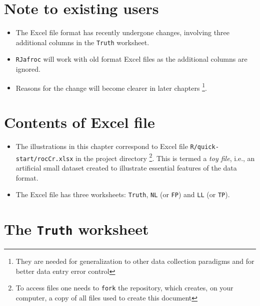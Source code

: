 \documentclass[
]{book}
\providecommand{\tightlist}{%
  \setlength{\itemsep}{0pt}\setlength{\parskip}{0pt}}
\begin{document}
\hypertarget{quick-start-data-format-note-to-existing-users}{%
\section{Note to existing users}\label{quick-start-data-format-note-to-existing-users}}

\begin{itemize}
\tightlist
\item
  The Excel file format has recently undergone changes, involving three additional columns in the \texttt{Truth} worksheet.
\item
  \texttt{RJafroc} will work with old format Excel files as the additional columns are ignored.
\item
  Reasons for the change will become clearer in later chapters \footnote{They are needed for generalization to other data collection paradigms and for better data entry error control}.
\end{itemize}

\hypertarget{quick-start-data-format-contents}{%
\section{Contents of Excel file}\label{quick-start-data-format-contents}}

\begin{itemize}
\tightlist
\item
  The illustrations in this chapter correspond to Excel file \texttt{R/quick-start/rocCr.xlsx} in the project directory \footnote{To access files one needs to \texttt{fork} the repository, which creates, on your computer, a copy of all files used to create this document}. This is termed a \emph{toy file}, i.e., an artificial small dataset created to illustrate essential features of the data format.
\item
  The Excel file has three worksheets: \texttt{Truth}, \texttt{NL} (or \texttt{FP}) and \texttt{LL} (or \texttt{TP}).
\end{itemize}

\hypertarget{quick-start-data-format-truth-worksheet}{%
\section{\texorpdfstring{The \texttt{Truth} worksheet}{The Truth worksheet}}\label{quick-start-data-format-truth-worksheet}}
\end{document}
